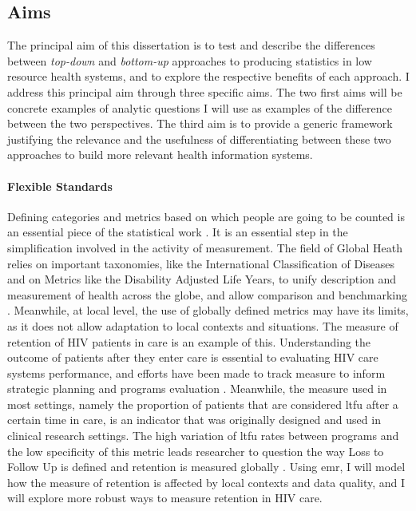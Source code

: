 \subsection{Aims}

The principal aim of this dissertation is to test and describe the differences between \textit{top-down} and \textit{bottom-up} approaches to producing statistics in low resource health systems, and to explore the respective benefits of each approach. I address this principal aim through three specific aims. The two first aims will be concrete examples of analytic questions I will use as examples of the difference between the two perspectives. The third aim is to provide a generic framework justifying the relevance and the usefulness of differentiating between these two approaches to build more relevant health information systems.


\paragraph{Flexible Standards} Defining categories and metrics based on which people are going to be counted is an essential piece of the statistical work \citep{desrosieres_politique_1993}. It is an essential step in the simplification involved in the activity of measurement. The field of Global Heath relies on important taxonomies, like the International Classification of Diseases and on Metrics like the Disability Adjusted Life Years, to unify description and measurement of health across the globe, and allow comparison and benchmarking \citep{murray_towards_2007,murray_health_2008}. Meanwhile, at local level, the use of globally defined metrics may have its limits, as it does not allow adaptation to local contexts and situations. The measure of retention of HIV patients in care is an example of this. Understanding the outcome of patients after they enter care is essential to evaluating HIV care systems performance, and efforts have been made to track measure to inform strategic planning and programs evaluation   \citep{the_global_fund_global_2014}. Meanwhile, the measure used in most settings, namely the proportion of patients that are considered \gls{ltfu} after a certain time in care, is an indicator that was originally designed and used in clinical research settings. The high variation of  \gls{ltfu} rates between programs and the low specificity of this metric leads researcher to question the way Loss to Follow Up is defined and retention is measured globally \citep{chi_universal_2011,yehia_comparing_2012,grimsrud_impact_2013,forster_electronic_2008}. Using \gls{emr}, I will model how the measure of retention is affected by local contexts and data quality, and I will explore  more robust ways to measure retention in HIV care.

